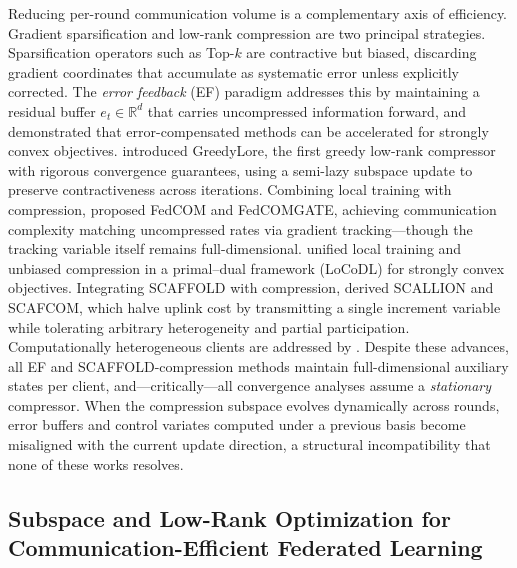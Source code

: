 \documentclass[11pt]{article}
\begin{document}
Reducing per-round communication volume is a complementary axis of efficiency. Gradient sparsification \citep{stich2018sparsified} and low-rank compression \citep{Vogels2019PowerSGDPL} are two principal strategies. Sparsification operators such as Top-$k$ are contractive but biased, discarding gradient coordinates that accumulate as systematic error unless explicitly corrected. The \emph{error feedback} (EF) paradigm \citep{stich2018sparsified} addresses this by maintaining a residual buffer $e_t \in \mathbb{R}^d$ that carries uncompressed information forward, and \citet{Qian2020ErrorCD} demonstrated that error-compensated methods can be accelerated for strongly convex objectives. \citet{chen2025greedy} introduced GreedyLore, the first greedy low-rank compressor with rigorous convergence guarantees, using a semi-lazy subspace update to preserve contractiveness across iterations. Combining local training with compression, \citet{Haddadpour2020FederatedLW} proposed FedCOM and FedCOMGATE, achieving communication complexity matching uncompressed rates via gradient tracking---though the tracking variable itself remains full-dimensional. \citet{Condat2024LoCoDLCD} unified local training and unbiased compression in a primal--dual framework (LoCoDL) for strongly convex objectives. Integrating SCAFFOLD with compression, \citet{Huang2023StochasticCA} derived SCALLION and SCAFCOM, which halve uplink cost by transmitting a single increment variable while tolerating arbitrary heterogeneity and partial participation. Computationally heterogeneous clients are addressed by \citet{Zhang2022CCFedAvgCC}. Despite these advances, all EF and SCAFFOLD-compression methods maintain full-dimensional auxiliary states per client, and---critically---all convergence analyses assume a \emph{stationary} compressor. When the compression subspace evolves dynamically across rounds, error buffers and control variates computed under a previous basis become misaligned with the current update direction, a structural incompatibility that none of these works resolves.

\subsection{Subspace and Low-Rank Optimization for Communication-Efficient Federated Learning}
\end{document}
